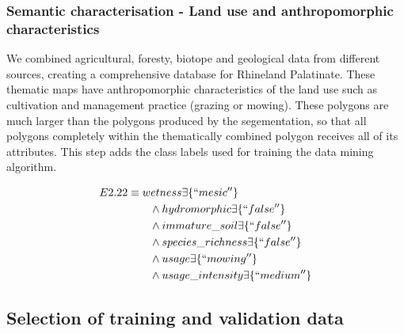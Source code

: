\documentclass[authoryear, review,12pt,number]{elsarticle}
\begin{document}
\subsubsection{Semantic characterisation - Land use and anthropomorphic
characteristics} We combined agricultural, foresty, biotope and geological data from different 
sources, creating a comprehensive database for Rhineland Palatinate. These 
thematic maps have anthropomorphic characteristics of the land use such as 
cultivation and management practice (grazing or mowing). These polygons are 
much larger than the polygons produced by the segementation, so that all 
polygons completely within the thematically combined polygon receives all of 
its attributes. This step adds the class labels used for training the data 
mining algorithm. 

\begin{equation}
\begin{align*}
E2.22 &\equiv wetness \exists \{``mesic''\} \\
&\qquad {} \land hydromorphic \exists \{``false''\} \\
&\qquad {} \land immature\_soil \exists \{``false''\} \\
&\qquad {} \land species\_richness \exists \{``false''\} \\
&\qquad {} \land usage \exists \{``mowing''\} \\
&\qquad {} \land usage\_intensity \exists \{``medium''\} \\
\end{align*}
\label{eq:description_logic}
\end{equation}


\label{Selection_of_training_validation_data}
\subsection{Selection of training and validation data}
\end{document}
